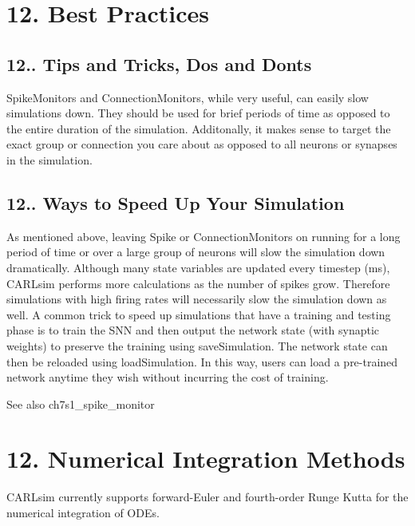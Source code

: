 \hypertarget{ch12_advanced_topics_ch12s1_best_practices}{}\section{12. Best Practices}\label{ch12_advanced_topics_ch12s1_best_practices}
\hypertarget{ch12_advanced_topics_ch12s1s1_tips_tricks}{}\subsection{12.. Tips and Tricks, Do\textquotesingle{}s and Don\textquotesingle{}ts}\label{ch12_advanced_topics_ch12s1s1_tips_tricks}
Spike\+Monitors and Connection\+Monitors, while very useful, can easily slow simulations down. They should be used for brief periods of time as opposed to the entire duration of the simulation. Additonally, it makes sense to target the exact group or connection you care about as opposed to all neurons or synapses in the simulation.\hypertarget{ch12_advanced_topics_ch12s1s2_speed_up}{}\subsection{12.. Ways to Speed Up Your Simulation}\label{ch12_advanced_topics_ch12s1s2_speed_up}
As mentioned above, leaving Spike or Connection\+Monitors on running for a long period of time or over a large group of neurons will slow the simulation down dramatically. Although many state variables are updated every timestep (ms), C\+A\+R\+Lsim performs more calculations as the number of spikes grow. Therefore simulations with high firing rates will necessarily slow the simulation down as well. A common trick to speed up simulations that have a training and testing phase is to train the S\+NN and then output the network state (with synaptic weights) to preserve the training using save\+Simulation. The network state can then be reloaded using load\+Simulation. In this way, users can load a pre-\/trained network anytime they wish without incurring the cost of training.

\begin{DoxySeeAlso}{See also}
ch7s1\+\_\+spike\+\_\+monitor
\end{DoxySeeAlso}
\hypertarget{ch12_advanced_topics_ch12s2_num_int}{}\section{12. Numerical Integration Methods}\label{ch12_advanced_topics_ch12s2_num_int}
C\+A\+R\+Lsim currently supports forward-\/\+Euler and fourth-\/order Runge Kutta for the numerical integration of O\+D\+Es.

